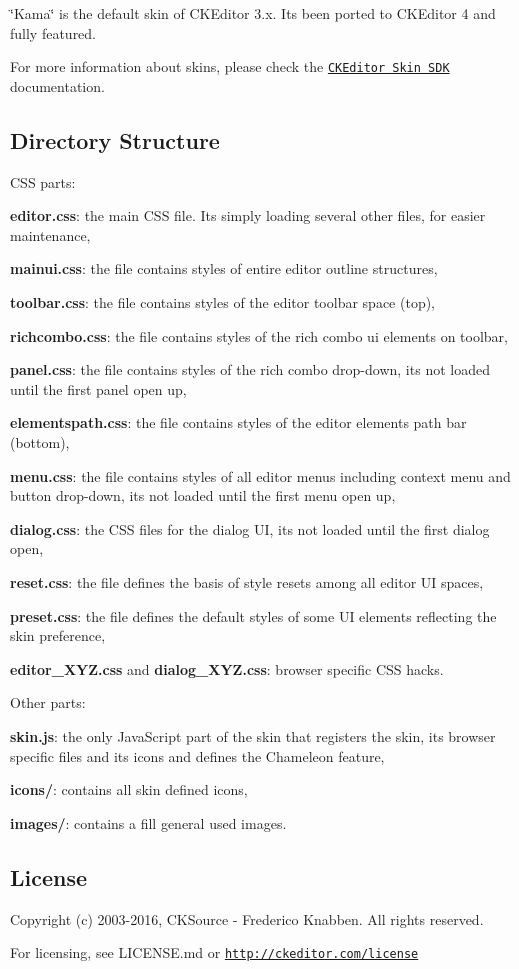 \char`\"{}\+Kama\char`\"{} is the default skin of C\+K\+Editor 3.\+x. It\textquotesingle{}s been ported to C\+K\+Editor 4 and fully featured.

For more information about skins, please check the \href{http://docs.cksource.com/CKEditor_4.x/Skin_SDK}{\tt C\+K\+Editor Skin S\+DK} documentation.

\subsection*{Directory Structure }

C\+SS parts\+:
\begin{DoxyItemize}
\item {\bfseries editor.\+css}\+: the main C\+SS file. It\textquotesingle{}s simply loading several other files, for easier maintenance,
\item {\bfseries mainui.\+css}\+: the file contains styles of entire editor outline structures,
\item {\bfseries toolbar.\+css}\+: the file contains styles of the editor toolbar space (top),
\item {\bfseries richcombo.\+css}\+: the file contains styles of the rich combo ui elements on toolbar,
\item {\bfseries panel.\+css}\+: the file contains styles of the rich combo drop-\/down, it\textquotesingle{}s not loaded until the first panel open up,
\item {\bfseries elementspath.\+css}\+: the file contains styles of the editor elements path bar (bottom),
\item {\bfseries menu.\+css}\+: the file contains styles of all editor menus including context menu and button drop-\/down, it\textquotesingle{}s not loaded until the first menu open up,
\item {\bfseries dialog.\+css}\+: the C\+SS files for the dialog UI, it\textquotesingle{}s not loaded until the first dialog open,
\item {\bfseries reset.\+css}\+: the file defines the basis of style resets among all editor UI spaces,
\item {\bfseries preset.\+css}\+: the file defines the default styles of some UI elements reflecting the skin preference,
\item {\bfseries editor\+\_\+\+X\+Y\+Z.\+css} and {\bfseries dialog\+\_\+\+X\+Y\+Z.\+css}\+: browser specific C\+SS hacks.
\end{DoxyItemize}

Other parts\+:
\begin{DoxyItemize}
\item {\bfseries skin.\+js}\+: the only Java\+Script part of the skin that registers the skin, its browser specific files and its icons and defines the Chameleon feature,
\item {\bfseries icons/}\+: contains all skin defined icons,
\item {\bfseries images/}\+: contains a fill general used images.
\end{DoxyItemize}

\subsection*{License }

Copyright (c) 2003-\/2016, C\+K\+Source -\/ Frederico Knabben. All rights reserved.

For licensing, see L\+I\+C\+E\+N\+S\+E.\+md or \href{http://ckeditor.com/license}{\tt http\+://ckeditor.\+com/license} 